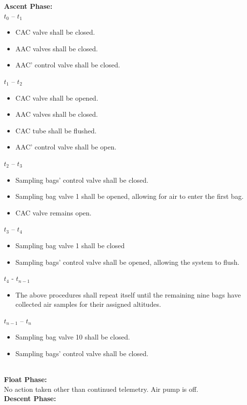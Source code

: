 \textbf{Ascent Phase:}\\
$t_0$ – $t_1$
\begin{itemize}
    \item CAC valve shall be closed.
    \item AAC valves shall be closed.
    \item AAC' control valve shall be closed.
    \end{itemize}
$t_1$ – $t_2$
\begin{itemize}
    \item CAC valve shall be opened.
    \item AAC valves shall be closed.
    \item CAC tube shall be flushed.
    \item AAC' control valve shall be open.
    \end{itemize}
$t_2$ – $t_3$
\begin{itemize}
    \item Sampling bags' control valve shall be closed.
    \item Sampling bag valve 1 shall be opened, allowing for air to enter the first bag.
    \item CAC valve remains open.
    \end{itemize}
$t_3$ – $t_4$
\begin{itemize}
    \item Sampling bag valve 1 shall be closed
    \item Sampling bags' control valve shall be opened, allowing the system to flush. 
    \end{itemize}
$t_4$ - $t_{n-1}$
\begin{itemize}
    \item The above procedures shall repeat itself until the remaining nine bags have collected air samples for their assigned altitudes.
    \end{itemize}
$t_{n-1}$ – $t_n$
\begin{itemize}
    \item Sampling bag valve 10 shall be closed.
    \item Sampling bags' control valve shall be closed.
\end{itemize}


\textbf{\\Float Phase:}\\
No action taken other than continued telemetry. Air pump is off.\\
 
\textbf{Descent Phase:}

